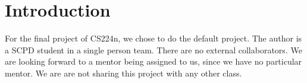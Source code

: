 \section{Introduction}
\label{sec:introduction}

For the final project of CS224n, we chose to do the default project. The author is a SCPD student in a single person team. There are no external collaborators. We are looking forward to a mentor being assigned to us, since we have no particular mentor. We are are not sharing this project with any other class.

